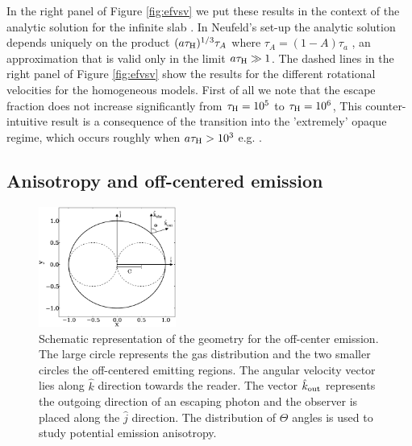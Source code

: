 \documentclass{emulateapj}
\newcommand{\ly}{{\ifmmode{{\rm Ly}\alpha~}\else{Ly$\alpha$~}\fi}}
\begin{document}
In the right panel of Figure \ref{fig:efvsv} we put these results in the context of
the analytic solution for the infinite slab \citep{Neufeld90}. In
Neufeld's set-up the analytic solution depends uniquely on the product
$(a\tau_{\rm   H})^{1/3}\tau_{A}$ where $\tau_{A} = (1 - A)\tau_{a}$ , an approximation 
that is valid only in the limit $a\tau_{\rm   H}\gg 1$. The dashed lines in
 the right panel of Figure \ref{fig:efvsv} show the results for the different rotational
velocities for the homogeneous models. First of all we note that the escape fraction does not
increase significantly from $\tau_{\rm H}=10^{5}$ to $\tau_{\rm H}=10^{6}$, This
 counter-intuitive result is a consequence of the transition into the 'extremely' opaque regime,
  which occurs roughly when $a\tau_{\rm{H}} > 10^{3}$ e.g. \citep{Neufeld90}.

\subsection{Anisotropy and off-centered emission}
\label{sec:off-center}

\begin{figure}
\begin{center}
  \includegraphics[width=0.40\textwidth]{f8.eps}
\end{center}
\caption{Schematic representation of the geometry for the off-center
  emission. The large circle represents the gas distribution and the
    two smaller circles the off-centered \ly emitting regions. The angular
    velocity vector lies along $\hat{k}$ direction
    towards the reader. The vector $\hat{k}_{\rm out}$ represents the
    outgoing direction of an escaping \ly photon and the observer is
    placed along the $\hat{j}$ direction. The distribution of $\Theta$
    angles is used to study potential emission anisotropy. 
    \label{fig:OCspheres}}
\end{figure}
\end{document}

